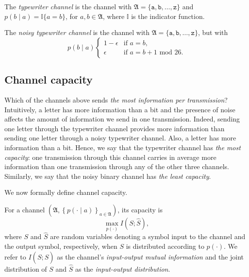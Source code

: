 \begin{example}
The \emph{typewriter channel} is the channel with $\mathfrak{A} = \{\texttt{a}, \texttt{b}, \ldots, \texttt{z}\}$ and $p(b \mid a) = \mathbb{I}\{a=b\}$, for $a, b \in \mathfrak{A}$, where $\mathbb{I}$ is the indicator function.
\end{example}

\begin{example}
The \emph{noisy typewriter channel} is the channel with $\mathfrak{A} = \{\texttt{a}, \texttt{b}, \ldots, \texttt{z}\}$, but with
%
$$p(b \mid a) 
\begin{cases}
1 - \epsilon & \text{if $a = b$,}\\
\epsilon & \text{if $a = b + 1 \text{ mod } 26$.}
\end{cases}
$$
%
\end{example}

\subsection{Channel capacity}

Which of the channels above sends \emph{the most information per transmission}? Intuitively, a letter has more information than a bit and the presence of noise affects the amount of information we send in one transmission. Indeed, sending one letter through the typewriter channel provides more information than sending one letter through a noisy typewriter channel. Also, a letter has more information than a bit. Hence, we say that the typewriter channel has \emph{the most capacity}: one transmission through this channel carries in average more information than one transmission through any of the other three channels. Similarly, we say that the noisy binary channel has \emph{the least capacity}.

We now formally define channel capacity.

\begin{definition}
For a channel $\left(\mathfrak{A}, \left\{p(\cdot \mid a)\right\}_{a \in \mathfrak{A}}\right)$, its capacity is
%
$$\max_{p(\cdot)} I(S; \hat{S}),$$
%
where $S$ and $\hat{S}$ are random variables denoting a symbol input to the channel and the output symbol, respectively, when $S$ is distributed according to $p(\cdot)$. We refer to $I(S; \hat{S})$ as the channel's \emph{input-output mutual information} and the joint distribution of $S$ and $\hat{S}$ as the \emph{input-output distribution}.
\end{definition}

